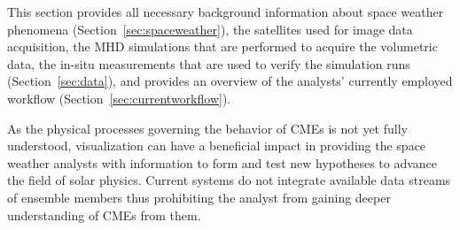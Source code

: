 \documentclass[journal]{vgtc}                %
\begin{document}
This section provides all necessary background information about space weather phenomena (Section~\ref{sec:spaceweather}), the satellites used for image data acquisition, the MHD simulations that are performed to acquire the volumetric data, the in-situ measurements that are used to verify the simulation runs (Section~\ref{sec:data}), and provides an overview of the analysts' currently employed workflow (Section~\ref{sec:currentworkflow}).

As the physical processes governing the behavior of CMEs is not yet fully understood, visualization can have a beneficial impact in providing the space weather analysts with information to form and test new hypotheses to advance the field of solar physics. Current systems do not integrate available data streams of ensemble members thus prohibiting the analyst from gaining deeper understanding of CMEs from them.
\end{document}

